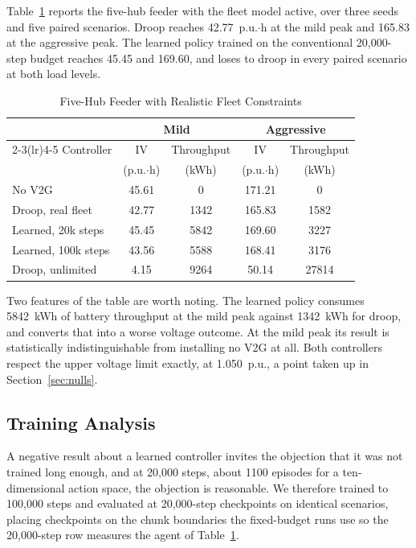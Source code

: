 \documentclass[conference,a4paper]{IEEEtran}
\begin{document}
Table~\ref{tab:controllers} reports the five-hub feeder with the fleet model active, over
three seeds and five paired scenarios. Droop reaches 42.77~p.u.$\cdot$h at the mild peak and
165.83 at the aggressive peak. The learned policy trained on the conventional 20,000-step
budget reaches 45.45 and 169.60, and loses to droop in every paired scenario at both load
levels.

\begin{table}[t]
\caption{Five-Hub Feeder with Realistic Fleet Constraints}
\label{tab:controllers}
\centering
\begin{tabular}{lcccc}
\toprule
 & \multicolumn{2}{c}{Mild} & \multicolumn{2}{c}{Aggressive} \\
\cmidrule(lr){2-3}\cmidrule(lr){4-5}
Controller & IV & Throughput & IV & Throughput \\
 & (p.u.$\cdot$h) & (kWh) & (p.u.$\cdot$h) & (kWh) \\
\midrule
No V2G              & 45.61 & 0    & 171.21 & 0 \\
Droop, real fleet   & 42.77 & 1342 & 165.83 & 1582 \\
Learned, 20k steps  & 45.45 & 5842 & 169.60 & 3227 \\
Learned, 100k steps & 43.56 & 5588 & 168.41 & 3176 \\
Droop, unlimited    & 4.15  & 9264 & 50.14  & 27814 \\
\bottomrule
\end{tabular}
\end{table}

Two features of the table are worth noting. The learned policy consumes 5842~kWh of battery
throughput at the mild peak against 1342~kWh for droop, and converts that into a worse voltage
outcome. At the mild peak its result is statistically indistinguishable from installing no V2G
at all. Both controllers respect the upper voltage limit exactly, at 1.050~p.u., a point taken
up in Section~\ref{sec:nulls}.

\subsection{Training Analysis}

A negative result about a learned controller invites the objection that it was not trained
long enough, and at 20,000 steps, about 1100 episodes for a ten-dimensional action space, the
objection is reasonable. We therefore trained to 100,000 steps and evaluated at 20,000-step
checkpoints on identical scenarios, placing checkpoints on the chunk boundaries the
fixed-budget runs use so the 20,000-step row measures the agent of
Table~\ref{tab:controllers}.
\end{document}
